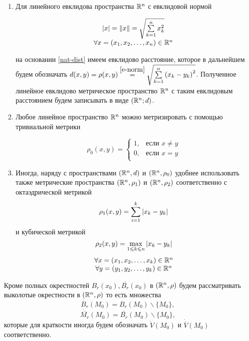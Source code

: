 \documentclass[../main.tex]{subfiles}
\begin{document}
\begin{rems} 

 \quad

 \begin{enumerate}
  \item  Для линейного евклидова пространства $\mathbb{R}^n$ с евклидовой
  нормой
  
  \begin{equation}
   \label{e-norm}
   \begin{array}{c}
    \left|{x}\right| = \lVert{x}\rVert = \sqrt{\sum\limits_{k=1}^n x_k^2} \\
    \forall x = (x_1, x_2, \dots, x_n) \in \mathbb{R}^n
   \end{array}
  \end{equation}
  
  на основании \eqref{nat-dist} имеем евклидово расстояние, которое
  в дальнейшем будем обозначать $d(x, y) = \rho(x, y) \stk{e-norm}{=}
  \sqrt{\sum\limits_{k=1}^n \left(x_k - y_k \right)^2 }$. Полученное линейное евклидово 
  метрическое пространство $\mathbb{R}^n$ с таким евклидовым расстоянием 
  будем записывать в виде $(\mathbb{R}^n; d)$.
  
  \item Любое линейное пространство $\mathbb{R}^n$ можно метризировать с
  помощью тривиальной метрики
  
  \[
   \rho_0(x, y) =
   \begin{cases}
    1, & \text{если } x \ne y \\
    0, & \text{если } x = y \\
   \end{cases}
  \]
  
  \item Иногда, наряду с пространствами $(\mathbb{R}^n, d)$ и $(\mathbb{R}^n, \rho_0)$
  удобнее использовать также метрические пространства $(\mathbb{R}^n, \rho_1)$
  и $(\mathbb{R}^n, \rho_2)$ соответственно с октаэдрической метрикой
  \[\rho_1(x, y) = \sum_{i=1}^k \left|{x_k - y_k}\right|\]
  и кубической метрикой
  \[\rho_2(x, y) = \max_{1 \leqslant k \leqslant n} \left|{x_k - y_k}\right|\]
  \[\begin{array}{c}
     \forall x = (x_1, x_2, \dots, x_k) \in \mathbb{R}^n \\
     \forall y = (y_1, y_2, \dots, y_k) \in \mathbb{R}^n \\
    \end{array}\]
 \end{enumerate}

\end{rems}
\begin{rem}
    Кроме полных окрестностей $B_r(x_0), \overline{B_r}(x_0)$ в $
    (\mathbb{R}^n, \rho)$ будем рассматривать выколотые окрестности в $
    (\mathbb{R}^n, \rho)$ то есть множества
    \[
      \dot{B_r}(M_0) = B_r(M_0) \backslash \{M_0\},
    \]
    \[
      \dot{\overline{M_r}}(M_0) = \overline{B_r}(M_0) \backslash \{M_0\},
    \]
    которые для краткости иногда будем обозначать $\dot{V}(M_0) $ и 
    $\dot{\overline{V}}(M_0)$ соответственно. 
  \end{rem}
\end{document}
